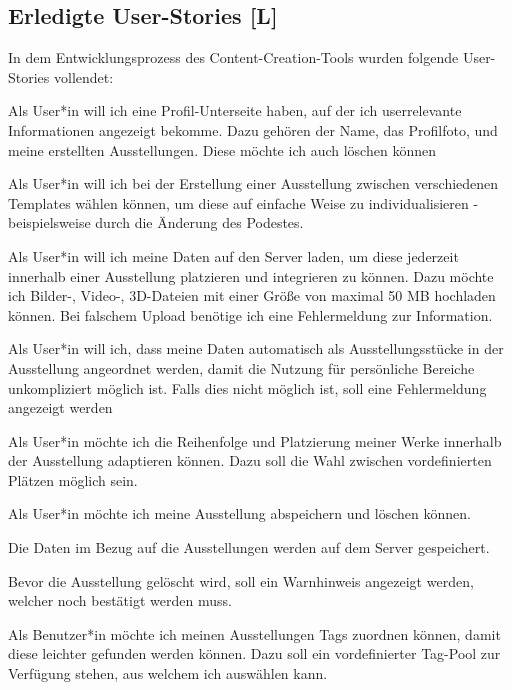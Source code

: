 \subsection{Erledigte User-Stories [L]}
In dem Entwicklungsprozess des Content-Creation-Tools wurden folgende User-Stories vollendet:
\begin{compactenum}
    \item  Als User*in will ich eine Profil-Unterseite haben, auf der ich userrelevante Informationen angezeigt bekomme. Dazu gehören der Name, das Profilfoto, und meine erstellten Ausstellungen. Diese möchte ich auch löschen können
    \item Als User*in will ich bei der Erstellung einer Ausstellung zwischen verschiedenen Templates wählen können, um diese auf einfache Weise zu individualisieren - beispielsweise durch die Änderung des Podestes.
    \item Als User*in will ich meine Daten auf den Server laden, um diese jederzeit innerhalb einer Ausstellung platzieren und integrieren zu können. Dazu möchte ich Bilder-, Video-, 3D-Dateien mit einer Größe von maximal 50 MB hochladen können. Bei falschem Upload benötige ich eine Fehlermeldung zur Information.
    \item  Als User*in will ich, dass meine Daten automatisch als Ausstellungsstücke in der Ausstellung angeordnet werden, damit die Nutzung für persönliche Bereiche unkompliziert möglich ist. Falls dies nicht möglich ist, soll eine Fehlermeldung angezeigt werden
    \item Als User*in möchte ich die Reihenfolge und Platzierung meiner Werke innerhalb der Ausstellung adaptieren können. Dazu soll die Wahl zwischen vordefinierten Plätzen möglich sein.
    \item Als User*in möchte ich meine Ausstellung abspeichern und löschen können. 
    \begin{compactitem}
        \item Die Daten im Bezug auf die Ausstellungen werden auf dem Server gespeichert.
        \item Bevor die Ausstellung gelöscht wird, soll ein Warnhinweis angezeigt werden, welcher noch bestätigt werden muss.
    \end{compactitem}
    \item Als Benutzer*in möchte ich meinen Ausstellungen Tags zuordnen können, damit diese leichter gefunden werden können. Dazu soll ein vordefinierter Tag-Pool zur Verfügung stehen, aus welchem ich auswählen kann.
\end{compactenum}

